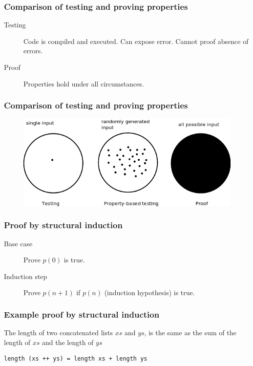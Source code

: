\documentclass{beamer}
\begin{document}
\begin{frame}
  \frametitle{Comparison of testing and proving properties}
  \begin{description}
  \item[Testing] Code is compiled and executed. Can expose error. Cannot proof absence of errors. 
  \item[Proof] Properties hold under all circumstances.
\end{description}
\end{frame}

\begin{frame}
  \frametitle{Comparison of testing and proving properties}
\begin{figure}
  \centering
     \includegraphics[width=1\textwidth]{testing}
\end{figure}
\end{frame}


\begin{frame}[fragile]
\frametitle{Proof by structural induction}
 \begin{description}
 \item[Base case] Prove $p(0)$ is true.
 \item[Induction step] Prove $p(n+1)$ if $p(n)$ (induction hypothesis) is true.
 \end{description}
\end{frame}

\begin{frame}[fragile]
\frametitle{Example proof by structural induction}
The length of two concatenated lists $xs$ and $ys$, is the same as the sum of the length of $xs$ and the length of $ys$
\begin{verbatim}
length (xs ++ ys) = length xs + length ys
\end{verbatim}

\end{frame}
\end{document}
